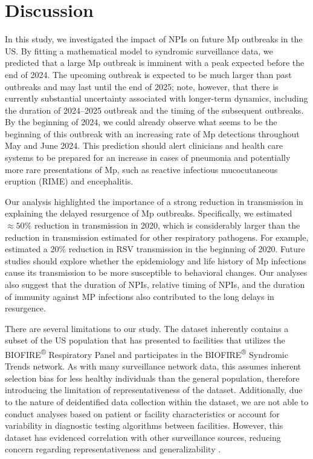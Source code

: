 \documentclass[12pt]{article}
\begin{document}
\section{Discussion}

In this study, we investigated the impact of NPIs on future Mp outbreaks in the US.
By fitting a mathematical model to syndromic surveillance data, we predicted that a large Mp outbreak is imminent with a peak expected before the end of 2024.
The upcoming outbreak is expected to be much larger than past outbreaks and may last until the end of 2025; note, however, that there is currently substantial uncertainty associated with longer-term dynamics, including the duration of 2024--2025 outbreak and the timing of the subsequent outbreaks.
By the beginning of 2024, we could already observe what seems to be the beginning of this outbreak with an increasing rate of Mp detections throughout May and June 2024. 
This prediction should alert clinicians and health care systems to be prepared for an increase in cases of pneumonia and potentially more rare presentations of Mp, such as reactive infectious mucocutaneous eruption (RIME) and encephalitis.

Our analysis highlighted the importance of a strong reduction in transmission in explaining the delayed resurgence of Mp outbreaks.
Specifically, we estimated $\approx 50\%$ reduction in transmission in 2020, which is considerably larger than the reduction in transmission estimated for other respiratory pathogens.
For example, \cite{baker2020impact} estimated a 20\% reduction in RSV transmission in the beginning of 2020.
Future studies should explore whether the epidemiology and life history of Mp infections cause its transmission to be more susceptible to behavioral changes.
Our analyses also suggest that the duration of NPIs, relative timing of NPIs, and the duration of immunity against MP infections also contributed to the long delays in resurgence.

There are several limitations to our study.
The dataset inherently contains a subset of the US population that has presented to facilities that utilizes the BIOFIRE\textsuperscript{®} Respiratory Panel and participates in the BIOFIRE\textsuperscript{®} Syndromic Trends network. As with many surveillance network data, this assumes inherent selection bias for less healthy individuals than the general population, therefore introducing the limitation of representativeness of the dataset. Additionally, due to the nature of deidentified data collection within the dataset, we are not able to conduct analyses based on patient or facility characteristics or account for variability in diagnostic testing algorithms between facilities. However, this dataset has evidenced correlation with other surveillance sources, reducing concern regarding representativeness and generalizability \citep{meyers2018automated}. 
\end{document}
